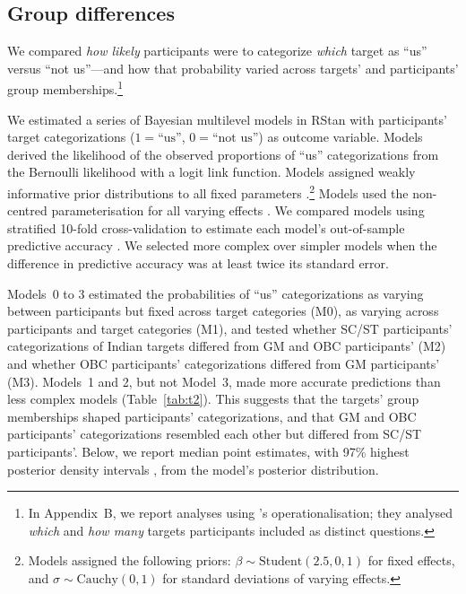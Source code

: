 \documentclass[12pt, a4paper]{article}
\begin{document}
\subsection{Group differences}

We compared \emph{how likely} participants were to categorize \emph{which} target as ``us'' versus ``not us''---and how that probability varied across targets' and participants' group memberships.\footnote{In Appendix~B, we report analyses using \citeauthor{dommelen_construing_2015}'s \citeyear{dommelen_construing_2015} operationalisation; they analysed \emph{which} and \emph{how many} targets participants included as distinct questions.}

We estimated a series of Bayesian multilevel models in RStan \cite{rstan_package} with participants' target categorizations ($1 = \text{``us''}$, $0 = \text{``not us''}$) as outcome variable. Models derived the likelihood of the observed proportions of ``us'' categorizations from the Bernoulli likelihood with a logit link function. Models assigned weakly informative prior distributions to all fixed parameters \cite{gelman_prior_2017}.\footnote{Models assigned the following priors: $\beta \sim \text{Student}(2.5, 0, 1)$ for fixed effects, and $\sigma \sim \text{Cauchy}(0, 1)$ for standard deviations of varying effects.} Models used the non-centred parameterisation for all varying effects \cite{betancourt_hamilton_2015}. We compared models using stratified 10-fold cross-validation to estimate each model's out-of-sample predictive accuracy . We selected more complex over simpler models when the difference in predictive accuracy was at least twice its standard error.

Models~0 to 3 estimated the probabilities of ``us'' categorizations as varying between participants but fixed across target categories (M0), as varying across participants and target categories (M1), and tested whether SC/ST participants' categorizations of Indian targets differed from GM and OBC participants' (M2) and whether OBC participants’ categorizations differed from GM participants' (M3). Models~1 and 2, but not Model~3, made more accurate predictions than less complex models (Table~\ref{tab:t2}). This suggests that the targets' group memberships shaped participants' categorizations, and that GM and OBC participants' categorizations resembled each other but differed from SC/ST participants'. Below, we report median point estimates, with 97\% highest posterior density intervals \cite{coda_package}, from the model's posterior distribution.
\end{document}
